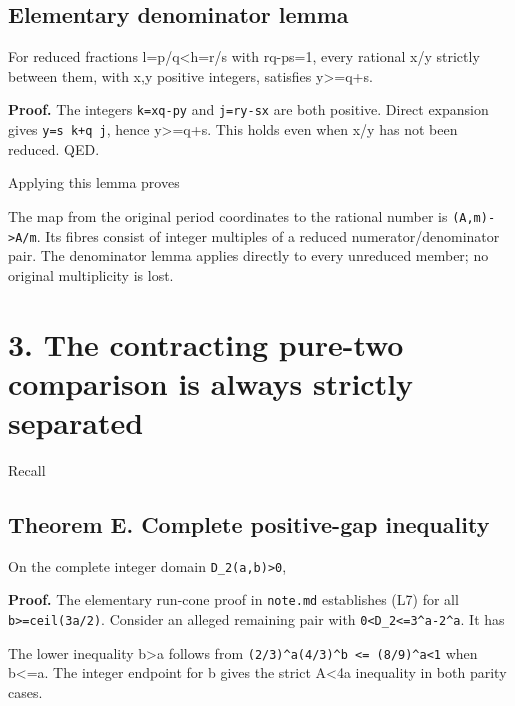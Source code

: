 \subsection{Elementary denominator lemma}

For reduced fractions l=p/q\textless h=r/s with rq-ps=1, every rational
x/y strictly between them, with x,y positive integers, satisfies
y\textgreater=q+s.

\textbf{Proof.} The integers \nolinkurl{k=xq-py} and \nolinkurl{j=ry-sx}
are both positive. Direct expansion gives \nolinkurl{y=s k+q j}, hence
y\textgreater=q+s. This holds even when x/y has not been reduced. QED.

Applying this lemma proves


The map from the original period coordinates to the rational number is
\nolinkurl{(A,m)->A/m}. Its fibres consist of integer multiples of a
reduced numerator/denominator pair. The denominator lemma applies
directly to every unreduced member; no original multiplicity is lost.

\section{3. The contracting pure-two comparison is always strictly
separated}

Recall


\subsection{Theorem E. Complete positive-gap inequality}

On the complete integer domain \nolinkurl{D_2(a,b)>0},


\textbf{Proof.} The elementary run-cone proof in \nolinkurl{note.md}
establishes (L7) for all \nolinkurl{b>=ceil(3a/2)}. Consider an alleged
remaining pair with \nolinkurl{0<D_2<=3^a-2^a}. It has


The lower inequality b\textgreater a follows from
\nolinkurl{(2/3)^a(4/3)^b <= (8/9)^a<1} when b\textless=a. The integer
endpoint for b gives the strict A\textless4a inequality in both parity
cases.

